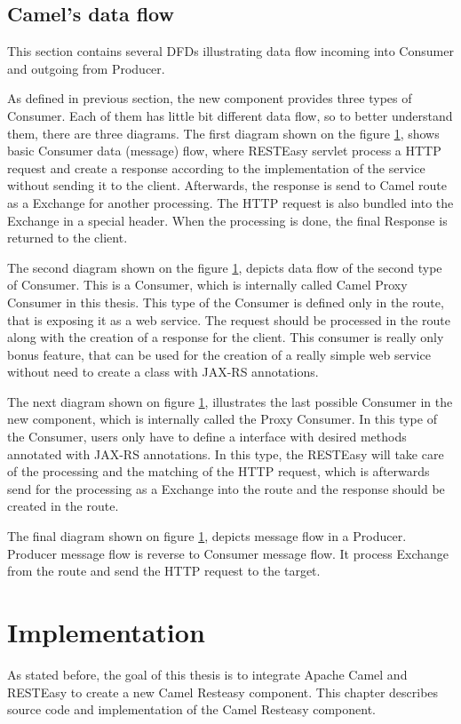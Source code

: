 \documentclass[12pt,final,oneside]{fithesis2}
\begin{document}
\section{Camel's data flow}
This section contains several DFDs illustrating data flow incoming into Consumer and outgoing from Producer. 

As defined in previous section, the new component provides three types of Consumer. Each of them has little bit different data flow, so to better understand them, there are three diagrams. The first diagram shown on the figure \ref{}, shows basic Consumer data (message) flow, where RESTEasy servlet process a HTTP request and create a response according to the implementation of the service without sending it to the client. Afterwards, the response is send to Camel route as a Exchange for another processing. The HTTP request is also bundled into the Exchange in a special header. When the processing is done, the final Response is returned to the client. 

The second diagram shown on the figure \ref{}, depicts data flow of the second type of Consumer. This is a Consumer, which is internally called Camel Proxy Consumer in this thesis. This type of the Consumer is defined only in the route, that is exposing it as a web service. The request should be processed in the route along with the creation of a response for the client. This consumer is really only bonus feature, that can be used for the creation of a really simple web service without need to create a class with JAX-RS annotations. 

The next diagram shown on figure \ref{}, illustrates the last possible Consumer in the new component, which is internally called the Proxy Consumer. In this type of the Consumer, users only have to define a interface with desired methods annotated with JAX-RS annotations. In this type, the RESTEasy will take care of the processing and the matching of the HTTP request, which is afterwards send for the processing as a Exchange into the route and the response should be created in the route.  


The final diagram shown on figure \ref{}, depicts message flow in a Producer. Producer message flow is reverse to Consumer message flow. It process Exchange from the route and send the HTTP request to the target. 


\chapter{Implementation}\label{impl}
As stated before, the goal of this thesis is to integrate Apache Camel and RESTEasy to create a new Camel Resteasy component. This chapter describes source code and implementation of the Camel Resteasy component. 
\end{document}
